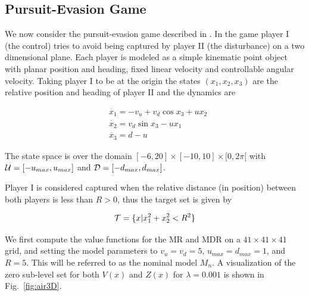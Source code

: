 \subsection{Pursuit-Evasion Game}

We now consider the pursuit-evasion game described in \cite{Mitchell2005}. In the game player I (the control) tries to avoid being captured by player II (the disturbance) on a two dimensional plane. Each player is modeled as a simple kinematic point object with planar position and heading, fixed linear velocity and controllable angular velocity. Taking player I to be at the origin the states $(x_1, x_2, x_3)$ are the relative position and heading of player II and the dynamics are

\begin{equation}
\begin{split}
&\dot{x_1}= -v_u+v_d \cos x_3 + ux_2\\ 
&\dot{x_2}= v_d \sin x_3 - ux_1\\ 
&\dot{x_3}= d-u
\end{split}
\end{equation}

The state space is over the domain $[-6,20] \times [-10,10] \times [0,2\pi[$ with $\mathcal{U}=[-u_{max},u_{max}]$ and $\mathcal{D}=[-d_{max}, d_{max}]$.

Player I is considered captured when the relative distance (in position) between both players is less than $R>0$, thus the target set is given by

\begin{equation}
\mathcal{T}= \{x| x_1^{2}+x_2^2 < R^2\}
\end{equation}


We first compute the value functions for the MR and MDR on a $41 \times 41 \times 41$ grid, and setting the model parameters to $v_u=v_d=5$, $u_{max}=d_{max}=1$, and $R=5$. This will be referred to as the nominal model $M_n$. A visualization of the zero sub-level set for both $V(x)$ and $Z(x)$ for $\lambda=0.001$ is shown in Fig.~\ref{fig:air3D}.



